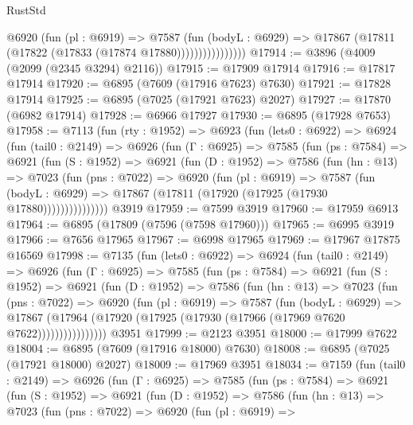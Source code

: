 \begin{lexlean}{RustStd}
\begin{coremodule}
                      @6920
                        (fun (pl : @6919) =>
                        @7587
                          (fun (bodyL : @6929) =>
                          @17867 (@17811 (@17822 (@17833 (@17874 @17880))))))))))))))))
@17914 := @3896 (@4009 (@2099 (@2345 @3294) @2116))
@17915 := @17909 @17914
@17916 := @17817 @17914
@17920 := @6895 (@7609 (@17916 @7623) @7630)
@17921 := @17828 @17914
@17925 := @6895 (@7025 (@17921 @7623) @2027)
@17927 := @17870 (@6982 @17914)
@17928 := @6966 @17927
@17930 := @6895 (@17928 @7653)
@17958 := @7113
    (fun (rty : @1952) =>
    @6923
      (fun (lets0 : @6922) =>
      @6924
        (fun (tail0 : @2149) =>
        @6926
          (fun (Γ : @6925) =>
          @7585
            (fun (ps : @7584) =>
            @6921
              (fun (S : @1952) =>
              @6921
                (fun (D : @1952) =>
                @7586
                  (fun (hn : @13) =>
                  @7023
                    (fun (pns : @7022) =>
                    @6920
                      (fun (pl : @6919) =>
                      @7587
                        (fun (bodyL : @6929) =>
                        @17867 (@17811 (@17920 (@17925 (@17930 @17880)))))))))))))))
    @3919
@17959 := @7599 @3919
@17960 := @17959 @6913
@17964 := @6895 (@17809 (@7596 (@7598 @17960)))
@17965 := @6995 @3919
@17966 := @7656 @17965
@17967 := @6998 @17965
@17969 := @17967 @17875 @16569
@17998 := @7135
    (fun (lets0 : @6922) =>
    @6924
      (fun (tail0 : @2149) =>
      @6926
        (fun (Γ : @6925) =>
        @7585
          (fun (ps : @7584) =>
          @6921
            (fun (S : @1952) =>
            @6921
              (fun (D : @1952) =>
              @7586
                (fun (hn : @13) =>
                @7023
                  (fun (pns : @7022) =>
                  @6920
                    (fun (pl : @6919) =>
                    @7587
                      (fun (bodyL : @6929) =>
                      @17867
                        (@17964 (@17920 (@17925 (@17930 (@17966 (@17969 @7620 @7622))))))))))))))))
    @3951
@17999 := @2123 @3951
@18000 := @17999 @7622
@18004 := @6895 (@7609 (@17916 @18000) @7630)
@18008 := @6895 (@7025 (@17921 @18000) @2027)
@18009 := @17969 @3951
@18034 := @7159
    (fun (tail0 : @2149) =>
    @6926
      (fun (Γ : @6925) =>
      @7585
        (fun (ps : @7584) =>
        @6921
          (fun (S : @1952) =>
          @6921
            (fun (D : @1952) =>
            @7586
              (fun (hn : @13) =>
              @7023
                (fun (pns : @7022) =>
                @6920
                  (fun (pl : @6919) =>

\end{coremodule}
\end{lexlean}

